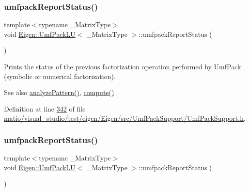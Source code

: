 \mbox{\label{class_eigen_1_1_umf_pack_l_u_a82497bbf75d995a6d4ae7e9191f79525}} 
\subsubsection{\texorpdfstring{umfpack\+Report\+Status()}{umfpackReportStatus()}\hspace{0.1cm}{\footnotesize\ttfamily [1/2]}}
{\footnotesize\ttfamily template$<$typename \+\_\+\+Matrix\+Type$>$ \\
void \hyperlink{class_eigen_1_1_umf_pack_l_u}{Eigen\+::\+Umf\+Pack\+LU}$<$ \+\_\+\+Matrix\+Type $>$\+::umfpack\+Report\+Status (\begin{DoxyParamCaption}{ }\end{DoxyParamCaption})\hspace{0.3cm}{\ttfamily [inline]}}

Prints the status of the previous factorization operation performed by Umf\+Pack (symbolic or numerical factorization).

\begin{DoxySeeAlso}{See also}
\hyperlink{class_eigen_1_1_umf_pack_l_u_ac7ea28b2017d6b26b7b08497f294e5e6}{analyze\+Pattern()}, \hyperlink{class_eigen_1_1_umf_pack_l_u_a05fb2b5717ebd67e46b83439721ceee7}{compute()} 
\end{DoxySeeAlso}


Definition at line \hyperlink{matio_2visual__studio_2test_2eigen_2_eigen_2src_2_umf_pack_support_2_umf_pack_support_8h_source_l00342}{342} of file \hyperlink{matio_2visual__studio_2test_2eigen_2_eigen_2src_2_umf_pack_support_2_umf_pack_support_8h_source}{matio/visual\+\_\+studio/test/eigen/\+Eigen/src/\+Umf\+Pack\+Support/\+Umf\+Pack\+Support.\+h}.

\mbox{\label{class_eigen_1_1_umf_pack_l_u_a82497bbf75d995a6d4ae7e9191f79525}} 
\subsubsection{\texorpdfstring{umfpack\+Report\+Status()}{umfpackReportStatus()}\hspace{0.1cm}{\footnotesize\ttfamily [2/2]}}
{\footnotesize\ttfamily template$<$typename \+\_\+\+Matrix\+Type$>$ \\
void \hyperlink{class_eigen_1_1_umf_pack_l_u}{Eigen\+::\+Umf\+Pack\+LU}$<$ \+\_\+\+Matrix\+Type $>$\+::umfpack\+Report\+Status (\begin{DoxyParamCaption}{ }\end{DoxyParamCaption})\hspace{0.3cm}{\ttfamily [inline]}}

